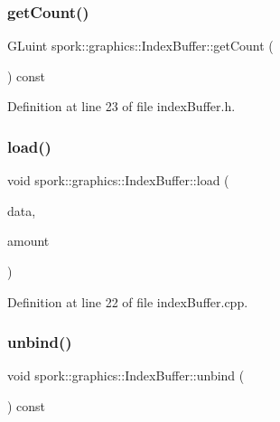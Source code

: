 \subsubsection{\texorpdfstring{get\+Count()}{getCount()}}
{\footnotesize\ttfamily G\+Luint spork\+::graphics\+::\+Index\+Buffer\+::get\+Count (\begin{DoxyParamCaption}{ }\end{DoxyParamCaption}) const\hspace{0.3cm}{\ttfamily [inline]}}



Definition at line 23 of file index\+Buffer.\+h.

\mbox{\label{classspork_1_1graphics_1_1_index_buffer_a124700de4463970ec9537d4be947687c}} 
\subsubsection{\texorpdfstring{load()}{load()}}
{\footnotesize\ttfamily void spork\+::graphics\+::\+Index\+Buffer\+::load (\begin{DoxyParamCaption}\item[{G\+Luint $\ast$}]{data,  }\item[{G\+Lsizei}]{amount }\end{DoxyParamCaption})}



Definition at line 22 of file index\+Buffer.\+cpp.

\mbox{\label{classspork_1_1graphics_1_1_index_buffer_a4d2cd37268b47c1705ba36a8034b4f93}} 
\subsubsection{\texorpdfstring{unbind()}{unbind()}}
{\footnotesize\ttfamily void spork\+::graphics\+::\+Index\+Buffer\+::unbind (\begin{DoxyParamCaption}{ }\end{DoxyParamCaption}) const}



